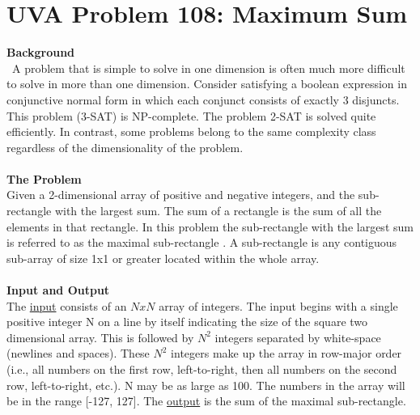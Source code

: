 \documentclass[12pt]{article}
\begin{document}

\newcommand{\hmwkClass}{COS 255}
\newcommand{\hmwkSemester}{Spring 2016}

\newcommand{\hmwkAuthorName}{Lukas Leung}
\newcommand{\hmwkAuthorID}{lleung}

\newcommand{\hmwkAssignmentNum}{5}

\newcommand{\hmwkProblemNum}{2}

\newcommand{\hmwkCollaborators}{}
\thispagestyle{fancycollab}



\section{UVA Problem 108: Maximum Sum}
\textbf{Background} \\
~\indent A problem that is simple to solve in one dimension is often much more difficult
to solve in more than one dimension. Consider satisfying a boolean expression in
conjunctive normal form in which each conjunct consists of exactly 3 disjuncts. This
problem (3-SAT) is NP-complete. The problem 2-SAT is solved quite efficiently. In
contrast, some problems belong to the same complexity class regardless of the
dimensionality of the problem. \\
\\
\textbf{The Problem} \\
\indent Given a 2-dimensional array of positive and negative integers, and the sub-rectangle
with the largest sum. The sum of a rectangle is the sum of all the elements in that
rectangle. In this problem the sub-rectangle with the largest sum is referred to as the
maximal sub-rectangle . A sub-rectangle is any contiguous sub-array of size 1x1 or
greater located within the whole array. \\
\\
\textbf{Input and Output} \\
\indent The \underline{input} consists of an $NxN$ array of integers. The input begins with a single
positive integer N on a line by itself indicating the size of the square two dimensional
array. This is followed by $N^2$ integers separated by white-space (newlines and spaces).
These $N^2$ integers make up the array in row-major order (i.e., all numbers on the
first row, left-to-right, then all numbers on the second row, left-to-right, etc.). N may
be as large as 100. The numbers in the array will be in the range [-127, 127]. The
\underline{output} is the sum of the maximal sub-rectangle.
\end{document}

